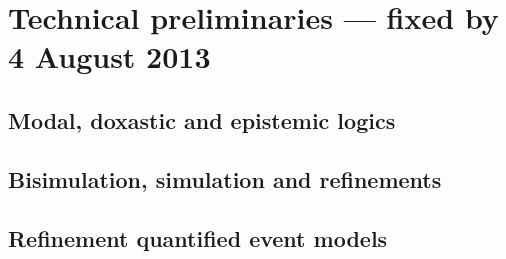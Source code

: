 \section{Technical preliminaries --- fixed by 4 August 2013}

\subsection{Modal, doxastic and epistemic logics}

\subsection{Bisimulation, simulation and refinements}

\subsection{Refinement quantified event models}
